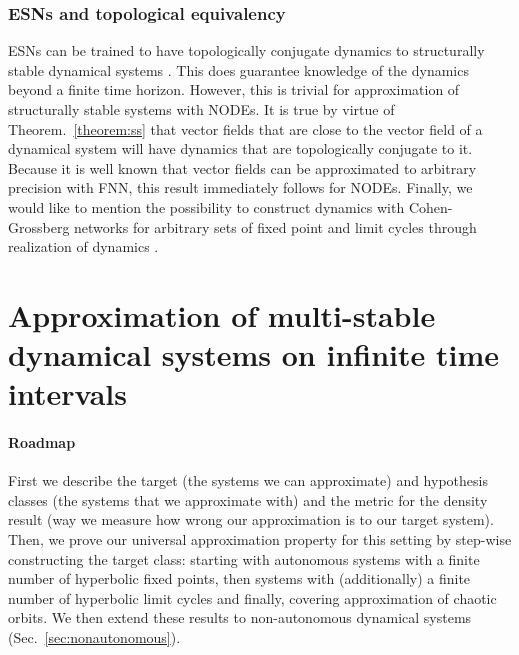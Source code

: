 \documentclass{article}
\theoremstyle{definition} \newtheorem{definition}{Definition}
\theoremstyle{remark} \newtheorem{remark}{Remark}
\newcounter{ct}
\begin{document}


\subsubsection{ESNs and topological equivalency}%
ESNs can be trained to have  topologically conjugate dynamics to structurally stable dynamical systems \citep{hart2020embedding}.
This does guarantee knowledge of the dynamics beyond a finite time horizon.
However, this is trivial for approximation of structurally stable systems with NODEs.
It is true by virtue of Theorem.~\ref{theorem:ss} that vector fields that are close to the vector field of a dynamical system will have dynamics that are topologically conjugate to it.
Because it is well known that vector fields can be approximated to arbitrary precision with FNN, this result immediately follows for NODEs.
Finally, we would like to mention the possibility to construct dynamics with Cohen-Grossberg networks for arbitrary sets of fixed point and limit cycles through realization of dynamics \citep{cohen1992construction}.




\section{Approximation of multi-stable dynamical systems on infinite time intervals}
\paragraph{Roadmap}
First we describe the target (the systems we can approximate) and hypothesis classes (the systems that we approximate with) and the metric for the density result (way we measure how wrong our approximation is to our target system).
Then, we prove our universal approximation property for this setting by step-wise constructing the target class:
starting with autonomous systems with a finite number of hyperbolic fixed points,
then systems with (additionally) a finite number of hyperbolic limit cycles
and finally, covering approximation of chaotic orbits.
We then extend these results to non-autonomous dynamical systems (Sec.~\ref{sec:nonautonomous}).
\end{document}
